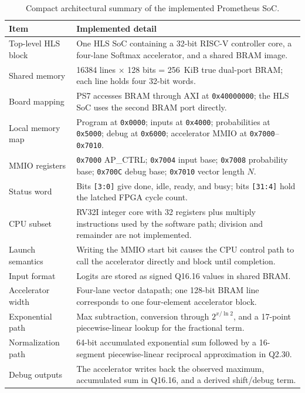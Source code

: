 \documentclass[conference]{IEEEtran}
\begin{document}
\begin{table}[t]
\centering
\caption{Compact architectural summary of the implemented Prometheus SoC.}
\label{tab:arch_summary}
\scriptsize
\begin{tabular}{@{}p{}p{}@{}}
\toprule
Item & Implemented detail \\
\midrule
Top-level HLS block & One HLS SoC containing a 32-bit RISC-V controller core, a four-lane Softmax accelerator, and a shared BRAM image. \\
Shared memory & 16384 lines $\times$ 128 bits = 256~KiB true dual-port BRAM; each line holds four 32-bit words. \\
Board mapping & PS7 accesses BRAM through AXI at \texttt{0x40000000}; the HLS SoC uses the second BRAM port directly. \\
Local memory map & Program at \texttt{0x0000}; inputs at \texttt{0x4000}; probabilities at \texttt{0x5000}; debug at \texttt{0x6000}; accelerator MMIO at \texttt{0x7000}--\texttt{0x7010}. \\
MMIO registers & \texttt{0x7000} AP\_CTRL; \texttt{0x7004} input base; \texttt{0x7008} probability base; \texttt{0x700C} debug base; \texttt{0x7010} vector length $N$. \\
Status word & Bits \texttt{[3:0]} give done, idle, ready, and busy; bits \texttt{[31:4]} hold the latched FPGA cycle count. \\
CPU subset & RV32I integer core with 32 registers plus multiply instructions used by the software path; division and remainder are not implemented. \\
Launch semantics & Writing the MMIO start bit causes the CPU control path to call the accelerator directly and block until completion. \\
Input format & Logits are stored as signed Q16.16 values in shared BRAM. \\
Accelerator width & Four-lane vector datapath; one 128-bit BRAM line corresponds to one four-element accelerator block. \\
Exponential path & Max subtraction, conversion through $2^{x/\ln 2}$, and a 17-point piecewise-linear lookup for the fractional term. \\
Normalization path & 64-bit accumulated exponential sum followed by a 16-segment piecewise-linear reciprocal approximation in Q2.30. \\
Debug outputs & The accelerator writes back the observed maximum, accumulated sum in Q16.16, and a derived shift/debug term. \\
\bottomrule
\end{tabular}
\end{table}
\end{document}
